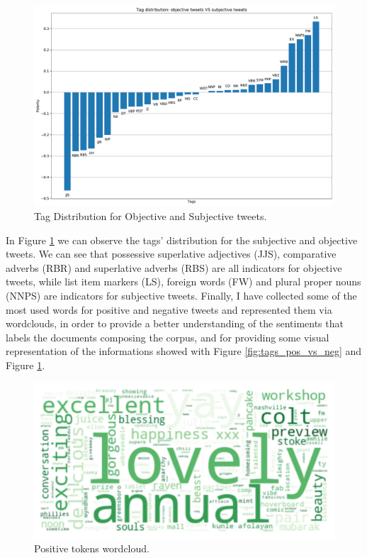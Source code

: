 \documentclass[11pt,twocolumn]{article}
\begin{document}
        \begin{figure}[h]
            \centering
            \includegraphics[width=\linewidth]{tag_distribution_objective_vs_subjective.pdf}
            \caption{Tag Distribution for Objective and Subjective tweets.}
            \label{fig:tags_obj_vs_subj}
        \end{figure}

        \noindent
        In Figure \ref{fig:tags_obj_vs_subj} we can observe the tags' distribution for the subjective and
        objective tweets. We can see that possessive superlative adjectives (JJS), comparative adverbs (RBR) and
        superlative adverbs (RBS) are all indicators for objective tweets, while list item markers (LS),
        foreign words (FW) and plural proper nouns (NNPS) are indicators for subjective tweets. Finally, I have
        collected some of the most used words for positive and negative tweets and represented them via
        wordclouds, in order to provide a better understanding of the sentiments that labels the documents
        composing the corpus, and for providing some visual representation of the informations showed with
        Figure \ref{fig:tags_pos_vs_neg} and Figure \ref{fig:tags_obj_vs_subj}.

        \begin{figure}[h]
            \centering
            \includegraphics[width=\linewidth]{positive_tokens_wordcloud.pdf}
            \caption{Positive tokens wordcloud.}
            \label{fig:positive_tokens_wordcloud}
        \end{figure}
\end{document}
